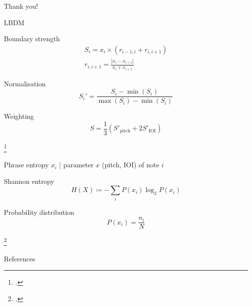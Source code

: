 \documentclass[handout]{beamer}
\begin{document}
\begin{frame}[standout]
    Thank you!
\end{frame}

\appendix

\begin{frame}
    \titlepage
\end{frame}

\begin{frame}{LBDM}
    \begin{block}{Boundary strength}
        \begin{gather*}
            S_i=x_i\times (r_{i-1, i} + r_{i, i+1}) \\
            r_{i, i+1}=\frac{|x_{i}-x_{i+1}|}{x_{i}+x_{i+1}}
        \end{gather*}
    \end{block}
    \begin{block}{Normalisation}
        \begin{equation*}
            S_i'=\frac{S_i-\min(S_i)}{\max(S_i)-\min(S_i)}
        \end{equation*}
    \end{block}
    \begin{block}{Weighting}
        \begin{equation*}
            S=\frac{1}{3}\left( S'_\mathrm{pitch} + 2 S'_\mathrm{IOI} \right)
        \end{equation*}
    \end{block}
    \hfill\footcite{cambouropoulos_lbdm_2011}

\end{frame}

\begin{frame}{Phrase entropy}
    $x_i$ | parameter $x$ (pitch, IOI) of note $i$
    \begin{block}{Shannon entropy}
        \begin{equation*}
            H(X)\coloneq-\sum_i P(x_i)\log_2 P(x_i)
        \end{equation*}
    \end{block}
    \begin{block}{Probability distribution}
        \begin{equation*}
            P(x_i)=\frac{n_i}{N}
        \end{equation*}
    \end{block}
    \hfill\footcite{li_automatic_2019}

\end{frame}

\begin{frame}[allowframebreaks]{References}
    \printbibliography[heading=none]
\end{frame}
\end{document}
